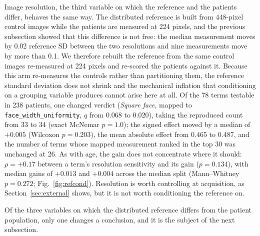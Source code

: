 \documentclass[11pt]{article}
\begin{document}
Image resolution, the third variable on which the reference and the patients
differ, behaves the same way. The distributed reference is built from 448-pixel
control images while the patients are measured at 224 pixels, and the previous
subsection showed that this difference is not free: the median measurement moves
by 0.02 reference SD between the two resolutions and nine measurements move by
more than 0.1. We therefore rebuilt the reference from the same control images
re-measured at 224 pixels and re-scored the patients against it. Because this
arm re-measures the controls rather than partitioning them, the reference
standard deviation does not shrink and the mechanical inflation that conditioning
on a grouping variable produces cannot arise here at all. Of the 78 terms
testable in 238 patients, one changed verdict (\emph{Square face}, mapped to
\texttt{face\_width\_uniformity}, $q$ from 0.068 to 0.020), taking the
reproduced count from 33 to 34 (exact McNemar $p = 1.0$); the signed effect moved
by a median of $+0.005$ (Wilcoxon $p = 0.203$), the mean absolute effect from
0.465 to 0.487, and the number of terms whose mapped measurement ranked in the
top 30 was unchanged at 26. As with age, the gain does not concentrate where it
should: $\rho = +0.17$ between a term's resolution sensitivity and its gain
($p = 0.134$), with median gains of $+0.013$ and $+0.004$ across the median split
(Mann--Whitney $p = 0.272$; Fig.~\ref{fig:refcond}).
Resolution is worth controlling at acquisition, as Section~\ref{sec:external}
shows, but it is not worth conditioning the reference on.

Of the three variables on which the distributed reference differs from the
patient population, only one changes a conclusion, and it is the subject of the
next subsection.
\end{document}
